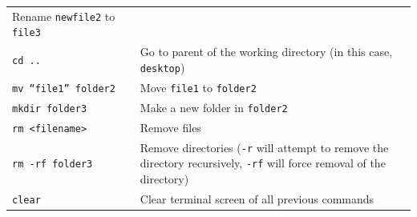 \documentclass[]{book}
\begin{document}
\begin{longtable}[]{@{}ll@{}}
\begin{minipage}[t]{0.53\columnwidth}
Rename \texttt{newfile2} to \texttt{file3}\strut
\end{minipage}\tabularnewline
\begin{minipage}[t]{0.41\columnwidth}\raggedright
\texttt{cd\ ..}\strut
\end{minipage} & \begin{minipage}[t]{0.53\columnwidth}\raggedright
Go to parent of the working directory (in this case, \texttt{desktop})\strut
\end{minipage}\tabularnewline
\begin{minipage}[t]{0.41\columnwidth}\raggedright
\texttt{mv\ “file1”\ folder2}\strut
\end{minipage} & \begin{minipage}[t]{0.53\columnwidth}\raggedright
Move \texttt{file1} to \texttt{folder2}\strut
\end{minipage}\tabularnewline
\begin{minipage}[t]{0.41\columnwidth}\raggedright
\texttt{mkdir\ folder3}\strut
\end{minipage} & \begin{minipage}[t]{0.53\columnwidth}\raggedright
Make a new folder in \texttt{folder2}\strut
\end{minipage}\tabularnewline
\begin{minipage}[t]{0.41\columnwidth}\raggedright
\texttt{rm\ \textless{}filename\textgreater{}}\strut
\end{minipage} & \begin{minipage}[t]{0.53\columnwidth}\raggedright
Remove files\strut
\end{minipage}\tabularnewline
\begin{minipage}[t]{0.41\columnwidth}\raggedright
\texttt{rm\ -rf\ folder3}\strut
\end{minipage} & \begin{minipage}[t]{0.53\columnwidth}\raggedright
Remove directories (\texttt{-r} will attempt to remove the directory recursively, \texttt{-rf} will force removal of the directory)\strut
\end{minipage}\tabularnewline
\begin{minipage}[t]{0.41\columnwidth}\raggedright
\texttt{clear}\strut
\end{minipage} & \begin{minipage}[t]{0.53\columnwidth}\raggedright
Clear terminal screen of all previous commands\strut
\end{minipage}\tabularnewline
\bottomrule
\end{longtable}
\end{document}
